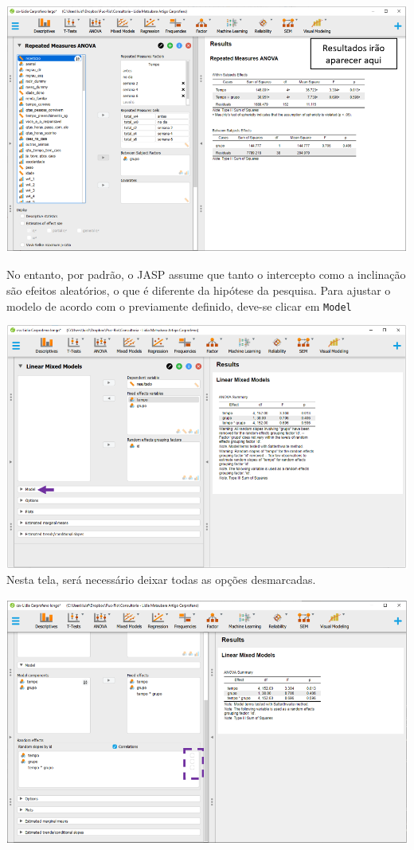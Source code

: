 \documentclass[
]{book}
\begin{document}
\includegraphics{./img/cap_anovarm_resultados2.png}

No entanto, por padrão, o JASP assume que tanto o intercepto como a
inclinação são efeitos aleatórios, o que é diferente da hipótese da
pesquisa. Para ajustar o modelo de acordo com o previamente definido,
deve-se clicar em \texttt{Model}

\includegraphics{./img/cap_lmm_model.png} Nesta tela, será necessário
deixar todas as opções desmarcadas.

\includegraphics{./img/cap_lmm_model2.png}
\end{document}
